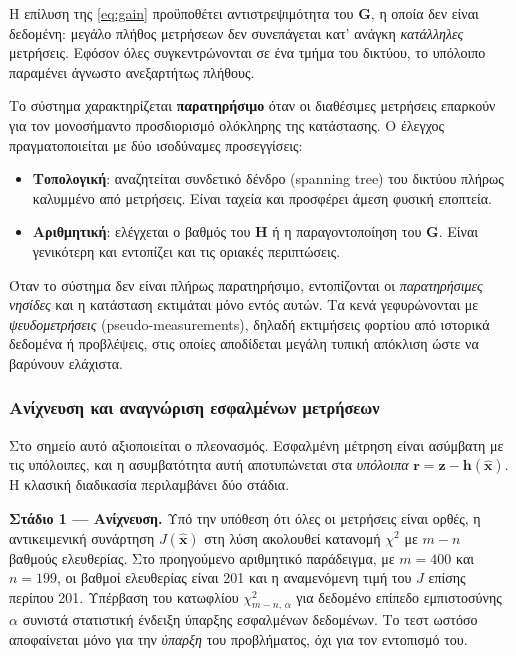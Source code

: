 Η επίλυση της \eqref{eq:gain} προϋποθέτει αντιστρεψιμότητα του $\mathbf{G}$, η οποία δεν
είναι δεδομένη: μεγάλο πλήθος μετρήσεων δεν συνεπάγεται κατ' ανάγκη \emph{κατάλληλες}
μετρήσεις. Εφόσον όλες συγκεντρώνονται σε ένα τμήμα του δικτύου, το υπόλοιπο παραμένει
άγνωστο ανεξαρτήτως πλήθους.

Το σύστημα χαρακτηρίζεται \textbf{παρατηρήσιμο} όταν οι διαθέσιμες μετρήσεις επαρκούν για
τον μονοσήμαντο προσδιορισμό ολόκληρης της κατάστασης. Ο έλεγχος πραγματοποιείται με δύο
ισοδύναμες προσεγγίσεις:

\begin{itemize}
\item \textbf{Τοπολογική}: αναζητείται συνδετικό δένδρο (spanning tree) του δικτύου πλήρως
      καλυμμένο από μετρήσεις. Είναι ταχεία και προσφέρει άμεση φυσική εποπτεία.
\item \textbf{Αριθμητική}: ελέγχεται ο βαθμός του $\mathbf{H}$ ή η παραγοντοποίηση του
      $\mathbf{G}$. Είναι γενικότερη και εντοπίζει και τις οριακές περιπτώσεις.
\end{itemize}

Όταν το σύστημα δεν είναι πλήρως παρατηρήσιμο, εντοπίζονται οι \emph{παρατηρήσιμες νησίδες}
και η κατάσταση εκτιμάται μόνο εντός αυτών. Τα κενά γεφυρώνονται με \emph{ψευδομετρήσεις}
(pseudo-measurements), δηλαδή εκτιμήσεις φορτίου από ιστορικά δεδομένα ή προβλέψεις, στις
οποίες αποδίδεται μεγάλη τυπική απόκλιση ώστε να βαρύνουν ελάχιστα.

\subsubsection*{Ανίχνευση και αναγνώριση εσφαλμένων μετρήσεων}

Στο σημείο αυτό αξιοποιείται ο πλεονασμός. Εσφαλμένη μέτρηση είναι ασύμβατη με τις
υπόλοιπες, και η ασυμβατότητα αυτή αποτυπώνεται στα \emph{υπόλοιπα}
$\mathbf{r} = \mathbf{z}-\mathbf{h}(\hat{\mathbf{x}})$. Η κλασική διαδικασία περιλαμβάνει
δύο στάδια.

\textbf{Στάδιο 1 --- Ανίχνευση.} Υπό την υπόθεση ότι όλες οι μετρήσεις είναι ορθές, η
αντικειμενική συνάρτηση $J(\hat{\mathbf{x}})$ στη λύση ακολουθεί κατανομή $\chi^2$ με
$m-n$ βαθμούς ελευθερίας. Στο προηγούμενο αριθμητικό παράδειγμα, με $m = 400$ και
$n = 199$, οι βαθμοί ελευθερίας είναι 201 και η αναμενόμενη τιμή του $J$ επίσης περίπου
201. Υπέρβαση του κατωφλίου $\chi^2_{m-n,\,\alpha}$ για δεδομένο επίπεδο εμπιστοσύνης
$\alpha$ συνιστά στατιστική ένδειξη ύπαρξης εσφαλμένων δεδομένων. Το τεστ ωστόσο
αποφαίνεται μόνο για την \emph{ύπαρξη} του προβλήματος, όχι για τον εντοπισμό του.

